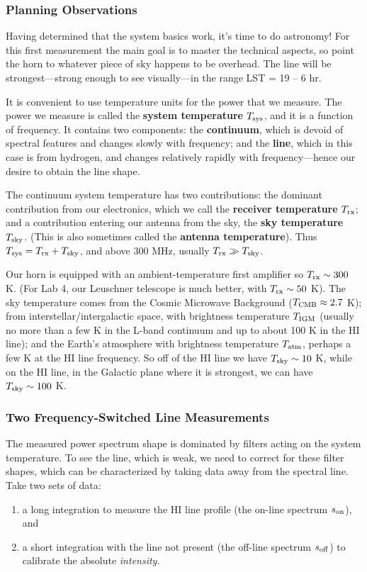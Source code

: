\documentclass[11pt,preprint]{aastex}
\begin{document}
\subsubsection{Planning Observations}

\noindent
Having determined that the system basics work, it's time to do
astronomy! For this first measurement the main goal is to master the
technical aspects, so point the horn to whatever piece of sky happens to be overhead.
The line will be strongest---strong enough
to see visually---in the range LST = 19 -- 6 hr.

It is convenient to use temperature units for the power
that we measure. The power we measure is called the
{\bf system temperature} $T_{\rm sys}$, and it is a function of frequency.
It contains two components:
the {\bf continuum}, which is devoid of spectral features
and changes slowly with frequency; and the {\bf line}, which in this
case is from hydrogen, and changes relatively rapidly with frequency---hence our
desire to obtain the line shape.

The continuum system temperature has two contributions: the dominant contribution
from our electronics, which we call the {\bf receiver temperature} $T_{\rm rx}$;
and a contribution entering our antenna from the sky, the {\bf sky temperature}
  $T_{\rm sky}$.  (This is also sometimes called the {\bf antenna temperature}).  
 Thus $T_{\rm sys}= T_{\rm rx} + T_{\rm sky}$, and above 300 MHz, usually $T_{\rm rx} \gg T_{\rm sky}$. 

Our horn is equipped with an ambient-temperature first amplifier so $T_{\rm rx} \sim
300$ K. (For Lab 4, our Leuschner telescope is much better, with $T_{\rm rx}
\sim 50$ K). The sky temperature comes from the Cosmic Microwave Background
($T_{\rm CMB}\approx 2.7$ K); from
interstellar/intergalactic space, with brightness temperature
$T_{\rm IGM}$ (usually no more than a few K in the L-band continuum and up to
about 100 K in the HI line); and the Earth's atmosphere with brightness
temperature $T_{\rm atm}$, perhaps a few K at the HI line frequency. So
off of the HI line we have $T_{\rm sky} \sim 10$ K, while on the HI line, in the
Galactic plane where it is strongest, we can have $T_{\rm sky} \sim 100$ K.

\subsubsection{Two Frequency-Switched Line Measurements}

\noindent
The measured power spectrum shape is dominated by
filters acting on the system temperature. To see the
line, which is weak, we need to correct for these filter shapes, which can
be characterized by taking data away from the spectral line.
Take two sets of data:
\begin{enumerate}
\item a long integration to measure the HI line profile (the on-line spectrum $s_{\rm on}$), and 
\item a short integration with the line not present (the off-line spectrum $s_{\rm off}$) to calibrate the absolute {\it intensity.}
\end{enumerate}
\end{document}
